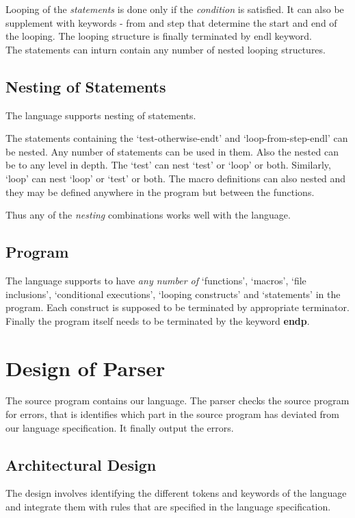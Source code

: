 \documentclass[12pt, oneside, a4paper]{article}
\begin{document}
Looping of the \emph{statements} is done only if the \emph{condition} is satisfied.  It can also be supplement with keywords - from and step that determine the start and end of the looping.  The looping structure is finally terminated by endl keyword.\\

The statements can inturn contain any number of nested looping structures.

\subsection{Nesting of Statements}
The language supports nesting of statements.

The statements containing the `test-otherwise-endt' and `loop-from-step-endl' can be nested.  Any number of statements can be used in them.  Also the nested can be to any level in depth.  The `test' can nest `test' or `loop' or both.  Similarly, `loop' can nest `loop' or `test' or both.  The macro definitions can also nested and they may be defined anywhere in the program but between the functions.

Thus any of the \emph{nesting} combinations works well with the language.

\subsection{Program}
The language supports to have \emph{any number of} `functions', `macros', `file inclusions', `conditional executions', `looping constructs' and `statements' in the program.  Each construct is supposed to be terminated by appropriate terminator.  Finally the program itself needs to be terminated by the keyword \textbf{endp}.

\newpage
\section{Design of Parser}

The source program contains our language.  The parser checks the source program for errors, that is identifies which part in the source program has deviated from our language specification.  It finally output the errors.

\subsection{Architectural Design}
The design involves identifying the different tokens and keywords of the language and integrate them with rules that are specified in the language specification.  
\end{document}
